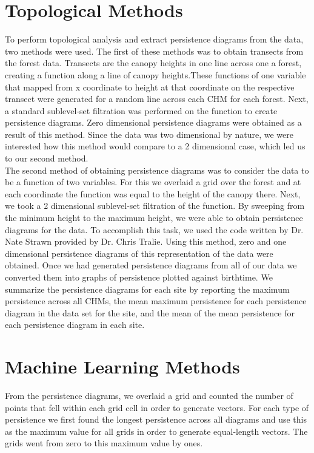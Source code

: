\documentclass[10pt]{article}
\begin{document}
\section*{Topological Methods}
\indent To perform topological analysis and extract persistence diagrams from the data, two methods were used. The first of these methods was to obtain transects from the forest data. Transects are the canopy heights in one line across one a forest, creating a function along a line of canopy heights.These functions of one variable that mapped from x coordinate to height at that coordinate on the respective transect were generated for a random line across each CHM for each forest. Next, a standard sublevel-set filtration was performed on the function to create persistence diagrams. Zero dimensional persistence diagrams were obtained as a result of this method. Since the data was two dimensional by nature, we were interested how this method would compare to a 2 dimensional case, which led us to our second method.\\

\indent The second method of obtaining persistence diagrams was to consider the data to be a function of two variables. For this we overlaid a grid over the forest and at each coordinate the function was equal to the height of the canopy there. Next, we took a 2 dimensional sublevel-set filtration of the function. By sweeping from the minimum height to the maximum height, we were able to obtain persistence diagrams for the data. To accomplish this task, we used the code written by Dr. Nate Strawn provided by Dr. Chris Tralie. Using this method, zero and one dimensional persistence diagrams of this representation of the data were obtained. Once we had generated persistence diagrams from all of our data we converted them into graphs of persistence plotted against birthtime. We summarize the persistence diagrams for each site by reporting the maximum persistence across all CHMs, the mean maximum persistence for each persistence diagram in the data set for the site, and the mean of the mean persistence for each persistence diagram in each site.

\section*{Machine Learning Methods}

\indent From the persistence diagrams, we overlaid a grid and counted the number of points that fell within each grid cell in order to generate vectors. For each type of persistence we first found the longest persistence across all diagrams and use this as the maximum value for all grids in order to generate equal-length vectors. The grids went from zero to this maximum value by ones.
\end{document}
